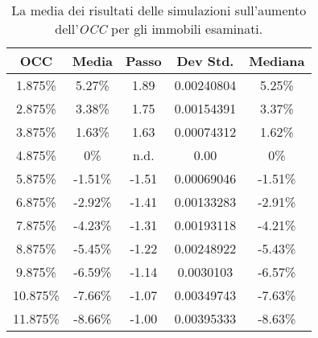 \begin{table}[htbp]
\begin{center}
\begin{tabular}[c]{|c||*{4}{c|}}
\hline
OCC & Media & Passo & Dev Std. & Mediana \\
\hline \hline
1.875\% & 5.27\% &  1.89 & 0.00240804 & 5.25\% \\ \hline
2.875\% & 3.38\% &  1.75 & 0.00154391 & 3.37\% \\ \hline
3.875\% & 1.63\% &  1.63 & 0.00074312 & 1.62\% \\ \hline
4.875\% & 0\% &  n.d. & 0.00 & 0\% \\ \hline
5.875\% & -1.51\% &  -1.51 & 0.00069046 & -1.51\% \\ \hline
6.875\% & -2.92\% & -1.41 & 0.00133283 & -2.91\% \\ \hline
7.875\% & -4.23\% & -1.31 & 0.00193118 & -4.21\% \\ \hline
8.875\% & -5.45\% & -1.22 & 0.00248922 & -5.43\% \\ \hline
9.875\% & -6.59\% & -1.14 & 0.0030103 & -6.57\% \\ \hline
10.875\% & -7.66\% & -1.07 & 0.00349743 & -7.63\% \\ \hline
11.875\% & -8.66\% & -1.00 & 0.00395333 & -8.63\% \\ \hline
\end{tabular}
\caption[Media risultati di $\Delta$ \textit{OCC}]{La media dei risultati delle simulazioni sull'aumento dell'{\itshape OCC} per gli immobili esaminati.}
\label{tab:varoccsintesi}
\end{center}
\end{table}

